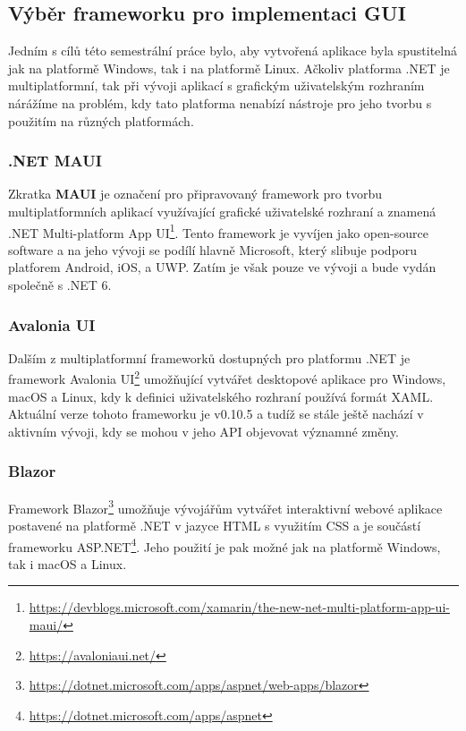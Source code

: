 \documentclass[12pt, a4paper]{article}
\begin{document}
    \subsection{Výběr frameworku pro implementaci GUI}
    Jedním s cílů této semestrální práce bylo, aby vytvořená aplikace byla spustitelná jak na platformě Windows, tak i na platformě Linux.
    Ačkoliv platforma .NET je multiplatformní, tak při vývoji aplikací s grafickým uživatelským rozhraním nárážíme na problém,
    kdy tato platforma nenabízí nástroje pro jeho tvorbu s použitím na různých platformách.
    
    \subsubsection{.NET MAUI}
    Zkratka \textbf{MAUI} je označení pro připravovaný framework pro tvorbu multiplatformních aplikací využívající
    grafické uživatelské rozhraní a znamená .NET Multi-platform App UI\footnote{\url{https://devblogs.microsoft.com/xamarin/the-new-net-multi-platform-app-ui-maui/}}.
    Tento framework je vyvíjen jako open-source software a na jeho vývoji se podílí hlavně Microsoft, který slibuje podporu
    platforem Android, iOS, a UWP. Zatím je však pouze ve vývoji a bude vydán společně s .NET 6.

    \subsubsection{Avalonia UI}
    Dalším z multiplatformní frameworků dostupných pro platformu .NET je framework Avalonia UI\footnote{\url{https://avaloniaui.net/}}
    umožňující vytvářet desktopové aplikace pro Windows, macOS a Linux, kdy k definici uživatelského rozhraní používá formát
    XAML. Aktuální verze tohoto frameworku je v0.10.5 a tudíž se stále ještě nachází v aktivním vývoji, kdy se mohou v jeho API objevovat
    významné změny.

    \subsubsection{Blazor}
    Framework Blazor\footnote{\url{https://dotnet.microsoft.com/apps/aspnet/web-apps/blazor}} umožňuje vývojářům vytvářet
    interaktivní webové aplikace postavené na platformě .NET v jazyce HTML s využitím CSS a je součástí frameworku
    ASP.NET\footnote{\url{https://dotnet.microsoft.com/apps/aspnet}}.
    Jeho použití je pak možné jak na platformě Windows, tak i macOS a Linux.
    
\end{document}
